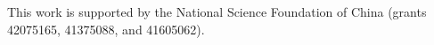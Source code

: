 \documentclass[essd]{copernicus}
\begin{document}


\begin{acknowledgements}

This work is supported by the National Science Foundation of China (grants 42075165, 41375088, and 41605062).

\end{acknowledgements}




\end{document}

